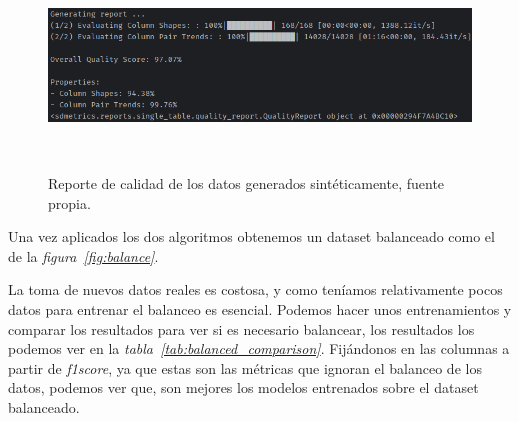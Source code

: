 \begin{figure}[!ht]
    \centering
    \includegraphics[width=0.8\linewidth]{media/images/quality_report.png}
    \caption{Reporte de calidad de los datos generados sintéticamente, fuente propia.}\ \label{fig:quality_report}
\end{figure}

Una vez aplicados los dos algoritmos obtenemos un \gls{dataset} balanceado como el de la \textit{figura\ \ref{fig:balance}}.

La toma de nuevos datos reales es costosa, y como teníamos relativamente pocos datos para entrenar el balanceo es esencial. Podemos hacer unos entrenamientos y comparar los resultados para ver si es necesario 
balancear, los resultados los podemos ver en la \textit{tabla\ \ref{tab:balanced_comparison}}. Fijándonos en las columnas a partir de \textit{f1score}, ya que estas son las métricas que ignoran el balanceo de 
los datos, podemos ver que, son mejores los modelos entrenados sobre el \gls{dataset} balanceado.

